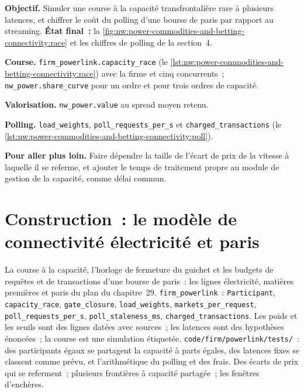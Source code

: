 \begin{tutorial}
\textbf{Objectif.} Simuler une course à la capacité transfrontalière rare à plusieurs latences, et chiffrer le coût du polling d'une bourse de paris par rapport au streaming.
\textbf{État final~:} la \cref{fig:nw:power-commodities-and-betting-connectivity:race} et les chiffres de polling de la section~4.
\begin{tutsteps}
\item \textbf{Course.} \texttt{firm\_powerlink.capacity\_race} (le \cref{lst:nw:power-commodities-and-betting-connectivity:race}) avec la
  firme et cinq concurrents~; \texttt{nw\_power.share\_curve} pour un ordre et pour trois ordres de capacité.
\item \textbf{Valorisation.} \texttt{nw\_power.value} au spread moyen retenu.
\item \textbf{Polling.} \texttt{load\_weights}, \texttt{poll\_requests\_per\_s} et \texttt{charged\_transactions}
  (le \cref{lst:nw:power-commodities-and-betting-connectivity:poll}).
\end{tutsteps}
\textbf{Pour aller plus loin.} Faire dépendre la taille de l'écart de prix de la vitesse à laquelle il se referme, et ajouter le temps de traitement propre
au module de gestion de la capacité, comme délai commun.
\end{tutorial}

\section{Construction~: le modèle de connectivité électricité et paris}\label{bld:nw:power-commodities-and-betting-connectivity:powerlink}

\begin{build}
 La course à la capacité, l'horloge de fermeture du guichet et les budgets de requêtes et de transactions d'une bourse de paris~: les lignes électricité,
matières premières et paris du plan du chapitre~29.
 \texttt{firm\_powerlink}~: \texttt{Participant}, \texttt{capacity\_race}, \texttt{gate\_closure},
\texttt{load\_weights}, \texttt{markets\_per\_request}, \texttt{poll\_requests\_per\_s}, \texttt{poll\_staleness\_ms},
\texttt{charged\_transactions}.
 Les poids et les seuils sont des lignes datées avec sources~; les latences sont des hypothèses énoncées~; la course est une simulation étiquetée.
 \texttt{code/firm/powerlink/tests/}~: des participants égaux se partagent la capacité à parts égales, des latences fixes se classent comme prévu, et
l'arithmétique du polling et des frais.
 Des écarts de prix qui se referment~; plusieurs frontières à capacité partagée~; les fenêtres d'enchères.
\end{build}

